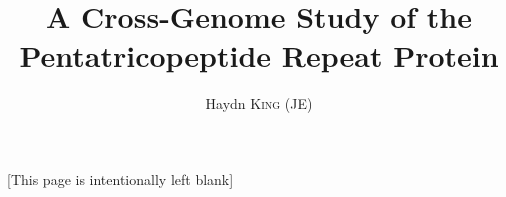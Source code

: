 \documentclass[11pt,a4paper, wide, twoside]{IIBproject}
\newcommand{\blankpage}{
  \newpage
  \thispagestyle{empty}
  \vspace*{\fill}
  \begin{center} 
    [This page is intentionally left blank]
  \end{center}
  \newpage
}
\begin{document}



\author{Haydn \textsc{King} (JE)}
\title{A Cross-Genome Study of the Pentatricopeptide Repeat Protein}
\maketitle

\blankpage

\setcounter{page}{1}
\end{document}

